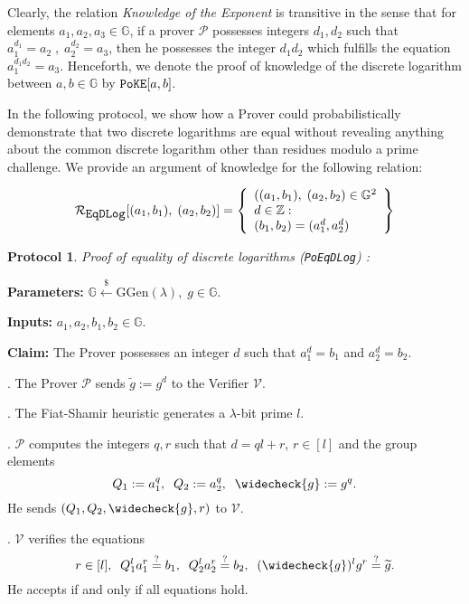 \documentclass[11pt, lettersize, notitlepage, leqno, footskip=0.6cm]{article}
\newcommand{\wti}{\widetilde}
\newcommand{\mc}{\mathcal}
\newcommand{\mb}{\mathbb}
\newcommand{\mr}{\mathrm}
\newcommand{\lamb}{\lambda}
\newcommand{\weck}{\widecheck}
\newcommand{\mP}{\mc{P}}
\newcommand{\vs}{\vspace{-0.15cm}}
\newcommand{\noin}{\noindent}
\newcommand{\sta}{\stackrel{?}{=}}
\newtheorem{Prot}[Thm]{Protocol}
\numberwithin{equation}{section}
\begin{document}
Clearly, the relation \textit{Knowledge of the Exponent} is transitive in the sense that for elements $a_1,a_2,a_3\in\mb{G}$, if a prover $\mP$ possesses integers $d_1,d_2$ such that $a_1^{d_1} = a_2\;,\;a_2^{d_2} = a_3$, then he possesses the integer $d_1d_2$ which fulfills the equation $a_1^{d_1d_2} = a_3$. Henceforth, we denote the proof of knowledge of the discrete logarithm between $a,b\in\mb{G}$ by $\verb|PoKE|[a,b]$. 

In the following protocol, we show how a Prover could probabilistically demonstrate that two discrete logarithms are equal without revealing anything about the common discrete logarithm other than residues modulo a prime challenge. We provide an argument of knowledge for  the following relation:

\[
  \mc{R}_{{\protect\verb|EqDLog|}}[(a_1, b_1),\;(a_2,b_2)] = \left\{\begin{array}{l}
    ((a_1, b_1),\; (a_2,b_2)\in\mb{G}^2\\
    d\in\mb{Z}: \\
    (b_1,b_2) = (a_1^d,a_2^d)
  \end{array}\right\}
\]
\vspace{0.15cm}


\begin{Prot}\label{EqDLog} \normalfont \textit{Proof of equality of discrete logarithms} (\verb|PoEqDLog|) :\end{Prot} \vspace{-0.3cm}

\noindent \textbf{Parameters:} $\mb{G}\xleftarrow{\$} \mr{GGen}(\lamb), \; g\in \mb{G}$.

\noindent \textbf{Inputs:} $a_1, a_2, b_1, b_2 \in \mb{G}$.

\noindent \textbf{Claim:} The Prover possesses an integer $d$ such that $a_1^d = b_1$ and $a_2^d = b_2$.

\begin{prf1}\normalfont \noin 1. The Prover $\mc{P}$ sends $\wti{g}:= g^d$ to the Verifier $\mc{V}$.

. The Fiat-Shamir heuristic generates a $\lamb$-bit prime $l$. 

. $\mc{P}$ computes the integers $q, r$ such that $d = ql+r$, $r\in [l]$ and the group elements \vs $$Q_1:= a_1^q,\;\; Q_2:= a_2^q,\;\; \weck{g}:= g^q.$$ He sends $(Q_1, Q_2, \weck{g}, r)$ to $\mc{V}$.

. $\mc{V}$ verifies the equations \vs $$r\in [l],\;\;Q_1^la_1^r \sta  b_1, \;\; Q_2^la_2^r \sta  b_2, \;\; (\weck{g})^lg^r \sta \wti{g}.$$ He accepts if and only if all equations hold.\end{prf1}
\end{document}
